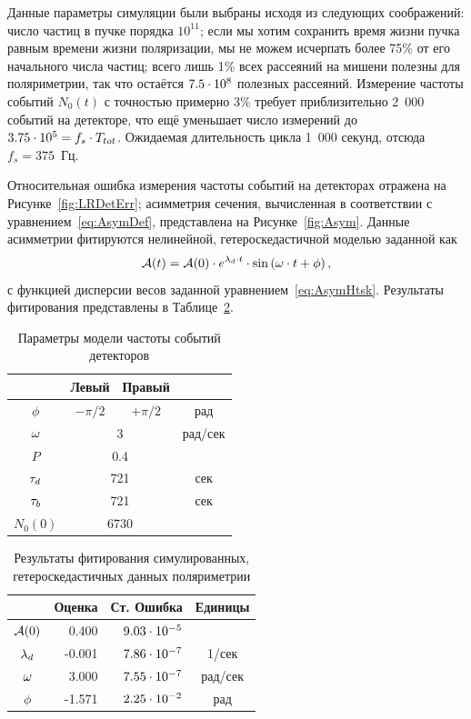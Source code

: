 Данные параметры симуляции были выбраны исходя из следующих
соображений: число частиц в пучке порядка $10^{11}$; если мы хотим
сохранить время жизни пучка равным времени жизни поляризации, мы не
можем исчерпать более 75\% от его начального числа частиц; всего лишь
1\% всех рассеяний на мишени полезны для поляриметрии, так что
остаётся ${7.5}\cdot 10^{8}$ полезных рассеяний. Измерение частоты событий
$N_0(t)$ с точностью примерно 3\% требует приблизительно 2~000 событий
на детекторе, что ещё уменьшает число измерений до ${{3.75}\cdot 10^{5}=f_s\cdot T_{tot}}$. 
Ожидаемая длительность цикла 1~000 секунд, отсюда $f_s = 375$~Гц. 

Относительная ошибка измерения частоты событий на детекторах отражена на
Рисунке~\ref{fig:LRDetErr}; асимметрия сечения, вычисленная в
соответствии с уравнением~\eqref{eq:AsymDef}, представлена на Рисунке~\ref{fig:Asym}.
Данные асимметрии фитируются нелинейной, гетероскедастичной моделью
заданной как
\[
\Asym(t) = \Asym(0)\cdot e^{\lamd\cdot t}\cdot\sin\bkt{\w\cdot t + \phi},
\]
с функцией дисперсии весов заданной
уравнением~\eqref{eq:AsymHtsk}. Результаты фитирования представлены в Таблице~\ref{tbl:FitRes}.
\begin{table}[h]
		\centering
		\caption{Параметры модели частоты событий детекторов\label{tbl:DetCntRtParam}}
		\begin{tabular}[t]{cccc}
			\toprule
			         & Левый    & Правый        &         \\ \midrule
			$\phi$   & $-\pi/2$ & $+\pi/2$      & рад     \\
			$\omega$     &  \multicolumn{2}{c}{3}   & рад/сек \\
			$P$      & \multicolumn{2}{c}{0.4}  &         \\
			$\tau_d$   & \multicolumn{2}{c}{721}  & сек     \\
			$\tau_b$   & \multicolumn{2}{c}{721}  & сек     \\
			$N_0(0)$ & \multicolumn{2}{c}{6730} &         \\ \bottomrule
		\end{tabular}
\end{table}

\begin{table}[h]
		\centering
		\caption{Результаты фитирования симулированных, гетероскедастичных данных поляриметрии\label{tbl:FitRes}}
		\begin{tabular}[t]{crrc}
			\toprule
			           & Оценка & Ст. Ошибка      & Единицы \\ \midrule
			$\mathcal{A}(0)$ & 0.400  & ${9.03}\cdot 10^{-5}$ &         \\
			$\lambda_d$    & -0.001 & ${7.86}\cdot 10^{-7}$ & 1/сек   \\
			$\omega$       & 3.000  & ${7.55}\cdot 10^{-7}$ & рад/сек \\
			$\phi$     & -1.571 & ${2.25}\cdot 10^{-2}$ & рад     \\ \bottomrule
		\end{tabular}
\end{table}

